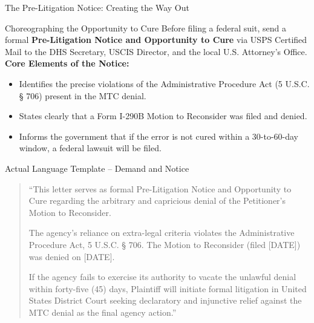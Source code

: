 \documentclass[11pt]{beamer}
\begin{document}
	
	\begin{frame}[allowframebreaks]{The Pre-Litigation Notice: Creating the Way Out}
		\scriptsize
		\begin{block}{Choreographing the Opportunity to Cure}
			Before filing a federal suit, send a formal \textbf{Pre-Litigation Notice and Opportunity to Cure} via USPS Certified Mail to the DHS Secretary, USCIS Director, and the local U.S. Attorney's Office.
			\vspace{0.15cm}
			\textbf{Core Elements of the Notice:}
			\begin{itemize}
				\item Identifies the precise violations of the Administrative Procedure Act (5 U.S.C. § 706) present in the MTC denial.
				\item States clearly that a Form I-290B Motion to Reconsider was filed and denied.
				\item Informs the government that if the error is not cured within a 30-to-60-day window, a federal lawsuit will be filed.
			\end{itemize}
		\end{block}
		\framebreak
		\begin{block}{Actual Language Template -- Demand and Notice}
			\begin{quote}
				``This letter serves as formal Pre-Litigation Notice and Opportunity to Cure regarding the arbitrary and capricious denial of the Petitioner's Motion to Reconsider. 
				
				The agency's reliance on extra-legal criteria violates the Administrative Procedure Act, 5 U.S.C. § 706. The Motion to Reconsider (filed [DATE]) was denied on [DATE]. 
				
				If the agency fails to exercise its authority to vacate the unlawful denial within forty-five (45) days, Plaintiff will initiate formal litigation in United States District Court seeking declaratory and injunctive relief against the MTC denial as the final agency action.''
			\end{quote}
		\end{block}
	\end{frame}
	
	
\end{document}
